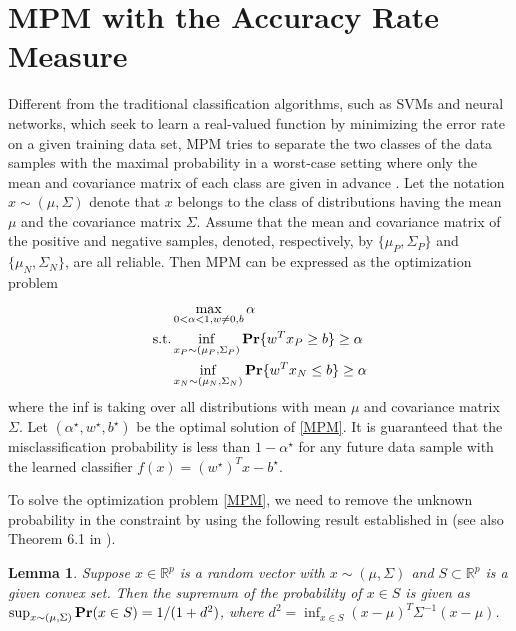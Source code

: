\documentclass[15pt]{article}
\newcommand{\R}{{\mathbb R}}
\newtheorem{lemma}{Lemma}
\begin{document}
\section{MPM with the Accuracy Rate Measure}\label{sec3}


Different from the traditional classification algorithms, such as SVMs and neural networks, which seek to
learn a real-valued function by minimizing the error rate on a given training data set,
MPM tries to separate the two classes of the data samples with the maximal probability in a worst-case setting
where only the mean and covariance matrix of each class are given in advance \cite{Lanckriet2002}.
Let the notation $x\sim (\mu,\Sigma)$ denote that $x$ belongs to the class of distributions having the mean $\mu$ and 
the covariance matrix $\Sigma$.
Assume that the mean and covariance matrix of the positive and negative samples, denoted, respectively,
by $\{\mu_P,\Sigma_P\}$ and $\{\mu_N,\Sigma_N\}$, are all reliable. Then MPM can be expressed
as the optimization problem
\begin{align}\label{MPM}
\begin{split}
&\max_{0<\alpha<1,w\neq 0,b}\alpha \qquad \\
\text{s.t.} &\inf_{x_P\sim(\mu_P,\Sigma_P)}{\rm\bf Pr}\{w^T x_P\ge b\}\ge\alpha\\
&\inf_{x_N\sim(\mu_N,\Sigma_N)}{\rm\bf Pr}\{w^Tx_N\le b\}\ge\alpha
\end{split}
\end{align}
where the inf is taking over all distributions with mean $\mu$ and covariance matrix $\Sigma$.
Let $(\alpha^\star,w^\star,b^\star)$ be the optimal solution of \eqref{MPM}.
It is guaranteed that the misclassification probability is less than $1-\alpha^\star$ for any future data sample
with the learned classifier $f(x)=(w^\star)^Tx-b^\star$.

To solve the optimization problem \eqref{MPM}, we need to remove the unknown probability 
in the constraint by using the following result established in \cite{Marshall1960} 
(see also Theorem 6.1 in \cite{Bertsimas2005}).

\begin{lemma}\label{Bertsimas}
Suppose $x\in\R^p $ is a random vector with $x\sim (\mu,\Sigma)$ and $S\subset\R^p$ is a given convex set. 
Then the supremum of the probability of $x\in S$ is given as
$\sup_{x\sim(\mu,\Sigma)}{\rm\bf Pr}(x\in S)={1}/({1+d^2})$,
where $d^2=\inf_{x\in S}(x-\mu)^T\Sigma^{-1}(x-\mu)$.
\end{lemma}
\end{document}
